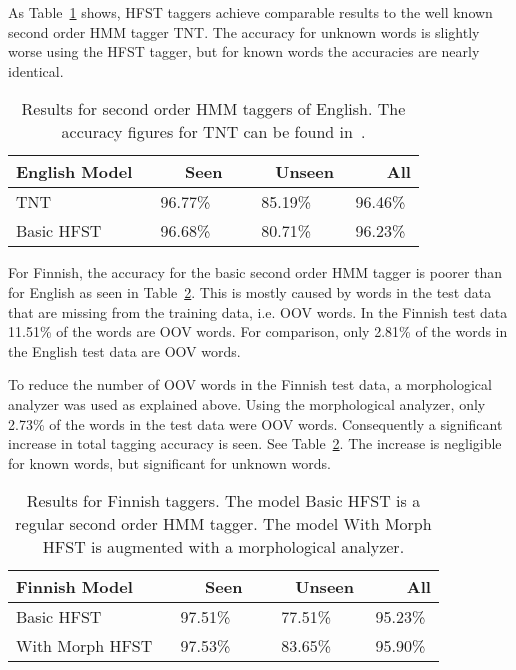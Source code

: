 \documentclass{llncs}
\begin{document}
As Table~\ref{eng-tagging-acc} shows, HFST taggers achieve comparable
results to the well known second order HMM tagger TNT. The accuracy
for unknown words is slightly worse using the HFST tagger, but for
known words the accuracies are nearly identical.

\begin{table}
  \caption{Results for second order HMM taggers of English. The accuracy
    figures for TNT can be found in~\cite{Halascy:2007}.}\label{eng-tagging-acc}
  \begin{center}
    \begin{tabular}{lccc}
      \hline
      English Model       & ~~~~Seen & ~~~~Unseen & ~~~~All \\
      \hline
      TNT         & 96.77\%  &    85.19\% & 96.46\% \\
      Basic HFST  & 96.68\%  &    80.71\% & 96.23\% \\
      \hline
    \end{tabular}
  \end{center}
\end{table}

For Finnish, the accuracy for the basic second order HMM tagger is
poorer than for English as seen in Table~\ref{fin-tagging-acc}. This
is mostly caused by words in the test data that are
missing from the training data, i.e. OOV words. In the Finnish test
data 11.51\% of the words are OOV words. For comparison, only 2.81\%
of the words in the English test data are OOV words.

To reduce the number of OOV words in the Finnish test data, a
morphological analyzer was used as explained above. Using the
morphological analyzer, only 2.73\% of the words in the test data
were OOV words. Consequently a significant increase in total tagging
accuracy is seen. See Table~\ref{fin-tagging-acc}. The increase is
negligible for known words, but significant for unknown words.

\begin{table}
  \caption{Results for Finnish taggers. The model Basic HFST is a
    regular second order HMM tagger. The model With Morph HFST is
    augmented with a morphological analyzer.}\label{fin-tagging-acc}
  \begin{center}
    \begin{tabular}{lccc}
      \hline 
      Finnish Model            & ~~~~Seen & ~~~~Unseen & ~~~~All \\
      \hline 
      Basic HFST       &  97.51\% &    77.51\% & 95.23\% \\
      With Morph HFST  &  97.53\% &    83.65\% & 95.90\% \\
      \hline
    \end{tabular}
  \end{center}
\end{table}
\end{document}
